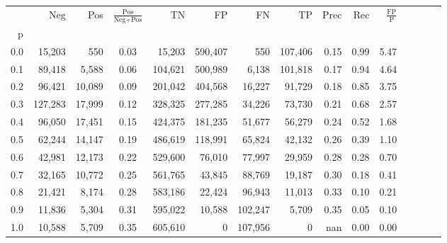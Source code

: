 \begin{tabular}{rrrcrrrrrrrrrrr}
\toprule
{} &      Neg &     Pos & $\frac{\text{Pos}}{\text{Neg}+\text{Pos}}$ &       TN &       FP &       FN &       TP &  Prec &   Rec & $\frac{\text{FP}}{\text{P}}$ \\
p   &          &         &                                            &          &          &          &          &       &       &                              \\
\midrule
0.0 &   15,203 &     550 &                                       0.03 &   15,203 &  590,407 &      550 &  107,406 &  0.15 &  0.99 &                         5.47 \\
0.1 &   89,418 &   5,588 &                                       0.06 &  104,621 &  500,989 &    6,138 &  101,818 &  0.17 &  0.94 &                         4.64 \\
0.2 &   96,421 &  10,089 &                                       0.09 &  201,042 &  404,568 &   16,227 &   91,729 &  0.18 &  0.85 &                         3.75 \\
0.3 &  127,283 &  17,999 &                                       0.12 &  328,325 &  277,285 &   34,226 &   73,730 &  0.21 &  0.68 &                         2.57 \\
0.4 &   96,050 &  17,451 &                                       0.15 &  424,375 &  181,235 &   51,677 &   56,279 &  0.24 &  0.52 &                         1.68 \\
0.5 &   62,244 &  14,147 &                                       0.19 &  486,619 &  118,991 &   65,824 &   42,132 &  0.26 &  0.39 &                         1.10 \\
0.6 &   42,981 &  12,173 &                                       0.22 &  529,600 &   76,010 &   77,997 &   29,959 &  0.28 &  0.28 &                         0.70 \\
0.7 &   32,165 &  10,772 &                                       0.25 &  561,765 &   43,845 &   88,769 &   19,187 &  0.30 &  0.18 &                         0.41 \\
0.8 &   21,421 &   8,174 &                                       0.28 &  583,186 &   22,424 &   96,943 &   11,013 &  0.33 &  0.10 &                         0.21 \\
0.9 &   11,836 &   5,304 &                                       0.31 &  595,022 &   10,588 &  102,247 &    5,709 &  0.35 &  0.05 &                         0.10 \\
1.0 &   10,588 &   5,709 &                                       0.35 &  605,610 &        0 &  107,956 &        0 &   nan &  0.00 &                         0.00 \\
\bottomrule
\end{tabular}
